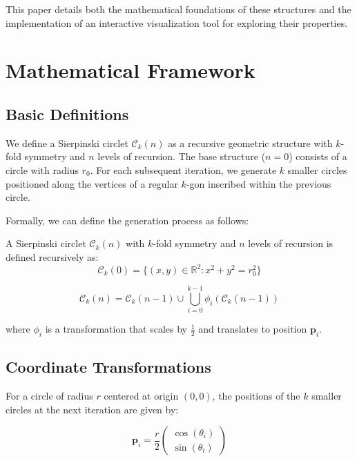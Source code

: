 \documentclass[12pt,a4paper]{article}
\begin{document}
This paper details both the mathematical foundations of these structures and the implementation of an interactive visualization tool for exploring their properties.

\section{Mathematical Framework}

\subsection{Basic Definitions}
We define a Sierpinski circlet $\mathcal{C}_k(n)$ as a recursive geometric structure with $k$-fold symmetry and $n$ levels of recursion. The base structure ($n=0$) consists of a circle with radius $r_0$. For each subsequent iteration, we generate $k$ smaller circles positioned along the vertices of a regular $k$-gon inscribed within the previous circle.

Formally, we can define the generation process as follows:

\begin{definition}
A Sierpinski circlet $\mathcal{C}_k(n)$ with $k$-fold symmetry and $n$ levels of recursion is defined recursively as:
\begin{equation}
\mathcal{C}_k(0) = \{(x,y) \in \mathbb{R}^2 : x^2 + y^2 = r_0^2\}
\end{equation}

\begin{equation}
\mathcal{C}_k(n) = \mathcal{C}_k(n-1) \cup \bigcup_{i=0}^{k-1} \phi_i(\mathcal{C}_k(n-1))
\end{equation}

where $\phi_i$ is a transformation that scales by $\frac{1}{2}$ and translates to position $\mathbf{p}_i$.
\end{definition}

\subsection{Coordinate Transformations}
For a circle of radius $r$ centered at origin $(0,0)$, the positions of the $k$ smaller circles at the next iteration are given by:

\begin{equation}
\mathbf{p}_i = \frac{r}{2} \begin{pmatrix} \cos(\theta_i) \\ \sin(\theta_i) \end{pmatrix}
\end{equation}
\end{document}

